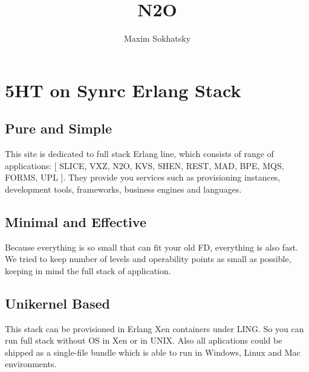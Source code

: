 
\renewcommand{\images}{http://synrc.com/images}

\title{N2O}
\author{Maxim Sokhatsky}



\section*{5HT on Synrc Erlang Stack}

\subsection*{Pure and Simple}
This site is dedicated to full stack Erlang line,
which consists of range of applications: [ SLICE, VXZ, N2O, KVS, SHEN, REST, MAD, BPE,
MQS, FORMS, UPL ]. They provide you services such as provisioning
instances, development tools, frameworks, business engines and languages.

\subsection*{Minimal and Effective}

Because everything is so small that can fit your old FD, everything is also fast.
We tried to keep number of levels and operability points as small as possible,
keeping in mind the full stack of application.

\subsection*{Unikernel Based}

This stack can be provisioned in Erlang Xen containers under LING.
So you can run full stack without OS in Xen or in UNIX. Also all
aplications could be shipped as a single-file bundle which is able
to run in Windows, Linux and Mac environments.



